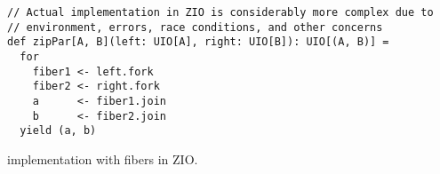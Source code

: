 \begin{algorithm}

\begin{verbatim}
// Actual implementation in ZIO is considerably more complex due to
// environment, errors, race conditions, and other concerns
def zipPar[A, B](left: UIO[A], right: UIO[B]): UIO[(A, B)] =
  for
    fiber1 <- left.fork
    fiber2 <- right.fork
    a      <- fiber1.join
    b      <- fiber2.join
  yield (a, b)

\end{verbatim}

\caption{ implementation with fibers in ZIO. \label{zio:fiber-zippar}}
\end{algorithm}